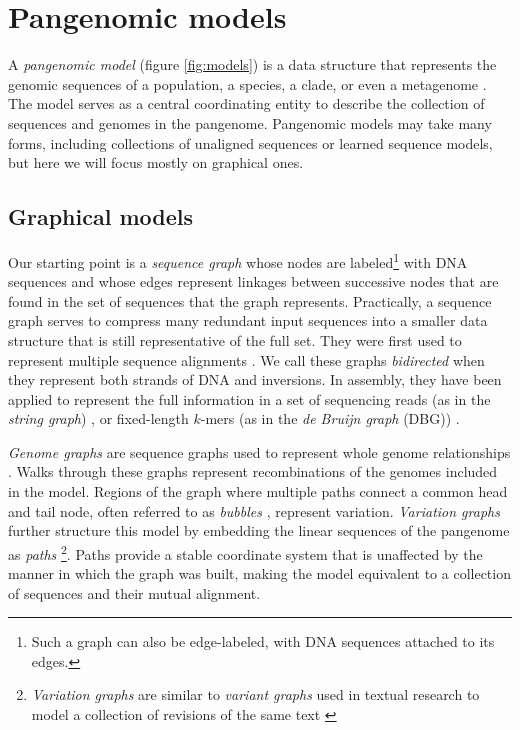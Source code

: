\section{Pangenomic models}
\label{sec:models}

A \emph{pangenomic model} (figure \ref{fig:models}) is a data structure that represents the genomic sequences of a population, a species, a clade, or even a metagenome \cite{computational2016computational}.
The model serves as a central coordinating entity to describe the collection of sequences and genomes in the pangenome.
Pangenomic models may take many forms, including collections of unaligned sequences or learned sequence models, but here we will focus mostly on graphical ones.

\subsection{Graphical models}

Our starting point is a \emph{sequence graph} \cite{hein1989new} whose nodes are labeled\footnote{Such a graph can also be edge-labeled, with DNA sequences attached to its edges.} with DNA sequences and whose edges represent linkages between successive nodes that are found in the set of sequences that the graph represents.
Practically, a sequence graph serves to compress many redundant input sequences into a smaller data structure that is still representative of the full set.
They were first used to represent multiple sequence alignments \cite{hein1989new,Lee_2002}.
We call these graphs \emph{bidirected} when they represent both strands of DNA and inversions.
In assembly, they have been applied to represent the full information in a set of sequencing reads (as in the \emph{string graph}) \cite{Myers_2005}, or fixed-length $k$-mers (as in the \emph{de Bruijn graph} (DBG)) \cite{Pevzner_2001}.

\emph{Genome graphs} are sequence graphs used to represent whole genome relationships \cite{Paten_2017}.
Walks through these graphs represent recombinations of the genomes included in the model.
Regions of the graph where multiple paths connect a common head and tail node, often referred to as \emph{bubbles} \cite{paten2018superbubbles}, represent variation.
\emph{Variation graphs} further structure this model by embedding the linear sequences of the pangenome as \emph{paths} \cite{Garrison_2018}\footnote{\emph{Variation graphs} are similar to \emph{variant graphs} used in textual research to model a collection of revisions of the same text \cite{schmidt2009data}}.
Paths provide a stable coordinate system that is unaffected by the manner in which the graph was built, making the model equivalent to a collection of sequences and their mutual alignment.

